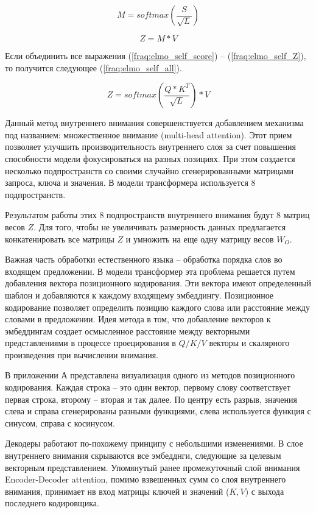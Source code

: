 \documentclass[a4paper,14pt]{article}
\begin{document}
\begin{equation}
	M = softmax(\dfrac{S}{\sqrt{L}})
	\label{fraq:elmo_self_softmax}
\end{equation}

\begin{equation}
	Z =  M * V
	\label{fraq:elmo_self_Z}
\end{equation}

Если объединить все выражения (\ref{fraq:elmo_self_score}) -- (\ref{fraq:elmo_self_Z}), то получится следующее (\ref{fraq:elmo_self_all}).

\begin{equation}
	Z =  softmax(\dfrac{Q * K^T}{\sqrt{L}}) * V
	\label{fraq:elmo_self_all}
\end{equation}

Данный метод внутреннего внимания совершенствуется добавлением механизма под названием: множественное внимание (multi-head attention).
Этот прием позволяет улучшить производительность внутреннего слоя за счет повышения способности модели фокусироваться на разных позициях.
При этом создается несколько подпространств со своими случайно сгенерированными матрицами запроса, ключа и значения.
В модели трансформера используется 8 подпространств.

Результатом работы этих 8 подпространств внутреннего внимания будут 8 матриц весов $Z$.
Для того, чтобы не увеличивать размерность данных предлагается конкатенировать все матрицы $Z$ и умножить на еще одну матрицу весов $W_O$.

Важная часть обработки естественного языка -- обработка порядка слов во входящем предложении.
В модели трансформер эта проблема решается путем добавления вектора позиционного кодирования.
Эти вектора имеют определенный шаблон и добавляются к каждому входящему эмбеддингу.
Позиционное кодирование позволяет определить позицию каждого слова или расстояние между словами в предложении.
Идея метода в том, что добавление векторов к эмбеддингам создает осмысленное расстояние между векторными представлениями в процессе проецирования в $Q/K/V$ векторы и скалярного произведения при вычислении внимания.

В приложении А представлена визуализация одного из методов позиционного кодирования.
Каждая строка -- это один вектор, первому слову соответствует первая строка, второму -- вторая и так далее.
По центру есть разрыв, значения слева и справа сгенерированы разными функциями, слева используется функция с синусом, справа с косинусом.

Декодеры работают по-похожему принципу с небольшими изменениями.
В слое внутреннего внимания скрываются все эмбедднги, следующие за целевым векторным представлением.
Упомянутый ранее промежуточный слой внимания Encoder-Decoder attention, помимо взвешенных сумм со слоя внутреннего внимания, принимает нв вход матрицы ключей и значений ($K,V$) с выхода последнего кодировщика.
\end{document}
